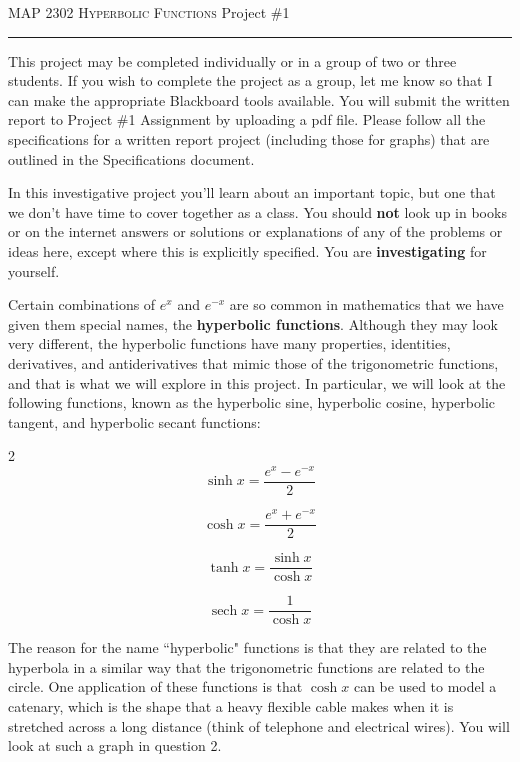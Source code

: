 \documentclass[12pt]{amsart}
\DeclareMathOperator{\sech}{sech}
\begin{document}
\thispagestyle{empty}

{\scshape MAP 2302} \hfill {\scshape \large Hyperbolic Functions} \hfill {Project \#1\scshape }
 
\smallskip

\hrule

\bigskip

This project may be completed individually or in a group of two or three students.  If you wish to complete the project as a group, let me know so that I can make the appropriate Blackboard tools available.  You will submit the written report to Project \#1 Assignment by uploading a pdf file.  Please follow all the specifications for a written report project (including those for graphs) that are outlined in the Specifications document.

\bigskip

In this investigative project you'll learn about an important topic, but one that we don't have time to cover together as a class.  You should {\bf not} look up in books or on the internet answers or solutions or explanations of any of the problems or ideas here, except where this is explicitly specified.  You are {\bf investigating} for yourself.  

\medskip

Certain combinations of $e^x$ and $e^{-x}$ are so common in mathematics that we have given them special
names, the {\bf hyperbolic functions}. Although they may look very different, the hyperbolic functions
have many properties, identities, derivatives, and antiderivatives that mimic those of the trigonometric functions,
and that is what we will explore in this project. In particular, we will look at the following
functions, known as the hyperbolic sine, hyperbolic cosine, hyperbolic tangent, and hyperbolic
secant functions:
\begin{multicols}{2}
$$\sinh x = \frac{e^x - e^{-x}}{2}$$

$$\cosh x = \frac{e^x + e^{-x}}{2}$$

$$\tanh x = \frac{\sinh x}{\cosh x}$$

$$\sech x = \frac{1}{\cosh x}$$

\end{multicols}

The reason for the name ``hyperbolic" functions is that they are related to the hyperbola in a similar
way that the trigonometric functions are related to the circle. One application of these functions is
that $\cosh x$ can be used to model a catenary, which is the shape that a heavy flexible cable makes
when it is stretched across a long distance (think of telephone and electrical wires). You will look
at such a graph in question 2.
\end{document}
